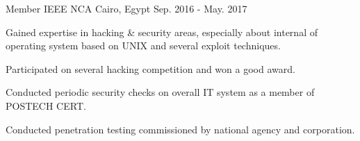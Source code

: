 \begin{cventries}
  \cventry
    {Member} %
    {IEEE NCA} %
    {Cairo, Egypt} %
    {Sep. 2016 - May. 2017} %
    {
      \begin{cvitems} %
        \item {Gained expertise in hacking \& security areas, especially about internal of operating system based on UNIX and several exploit techniques.}
        \item {Participated on several hacking competition and won a good award.}
        \item {Conducted periodic security checks on overall IT system as a member of POSTECH CERT.}
        \item {Conducted penetration testing commissioned by national agency and corporation.}
      \end{cvitems}
    }

\end{cventries}
